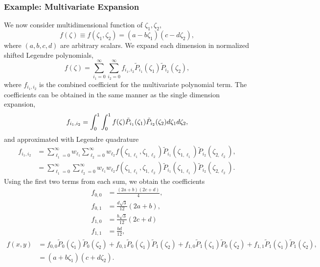 \subsubsection{Example: Multivariate Expansion}
We now consider multidimensional function of $\zeta_1,\zeta_2$,
\begin{equation}
f(\zeta)\equiv f(\zeta_1,\zeta_2)=(a-b\zeta_1)(c-d\zeta_2),
\end{equation}
where $(a,b,c,d)$ are arbitrary scalars.  We expand each dimension in normalized shifted Legendre polynomials,
\begin{equation}
f(\zeta)=\sum_{i_1=0}^\infty \sum_{i_2=0}^\infty f_{i_1,i_2}\tilde P_{i_1}(\zeta_1)\tilde P_{i_2}(\zeta_2),
\end{equation}
where $f_{i_1,i_2}$ is the combined coefficient for the multivariate polynomial term.  The coefficients can be obtained in the same manner as the single dimension expansion,
\begin{equation}
f_{i_1,i_2}=\int_0^1\int_0^1 f(\zeta)\tilde P_{i_1}(\zeta_1)\tilde P_{i_2}(\zeta_2)d\zeta_1d\zeta_2,
\end{equation}
and approximated with Legendre quadrature
\begin{align}
f_{i_1,i_2}&=\sum_{\ell_1=0}^\infty w_{\ell_1} \sum_{\ell_2=0}^\infty w_{\ell_2}
     f(\zeta_{1,\ell_1},\zeta_{1,\ell_2})\tilde P_{i_1}(\zeta_{1,\ell_1})\tilde P_{i_2}(\zeta_{2,\ell_2}),\\
  &=\sum_{\ell_1=0}^\infty \sum_{\ell_2=0}^\infty w_{\ell_1}w_{\ell_2}
     f(\zeta_{1,\ell_1},\zeta_{1,\ell_2})\tilde P_{i_1}(\zeta_{1,\ell_1})\tilde P_{i_2}(\zeta_{2,\ell_2}).
\end{align}
Using the first two terms from each sum, we obtain the coefficients
\begin{align}
f_{0,0}&=\frac{(2a+b)(2c+d)}{4},\\
f_{0,1}&= \frac{d\sqrt{3}}{12}(2a+b), \\
f_{1,0}&=\frac{b\sqrt{3}}{12}(2c+d) \\
f_{1,1}&=\frac{bd}{12},
\end{align}
\begin{align}
f(x,y)&=f_{0,0}\tilde P_0(\zeta_1)\tilde P_0(\zeta_2) +
f_{0,1}\tilde P_0(\zeta_1)\tilde P_1(\zeta_2) +
f_{1,0}\tilde P_1(\zeta_1)\tilde P_0(\zeta_2) +
f_{1,1}\tilde P_1(\zeta_1)\tilde P_1(\zeta_2),\\
&=(a+b\zeta_1)(c+d\zeta_2).
\end{align}

